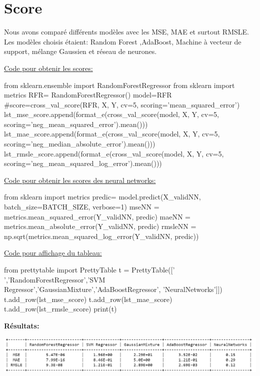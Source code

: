 \documentclass[a4paper,oneside,11pt]{article}
\begin{document}
\section*{Score}
%
\qquad Nous avons comparé différents modèles avec les MSE, MAE et surtout RMSLE. Les modèles choisis étaient: Random Forest ,AdaBoost, Machine à vecteur de support, mélange Gaussien et réseau de neurones.

\underline{Code pour obtenir les scores:}
\begin{code-Python}
from sklearn.ensemble import RandomForestRegressor 
from sklearn import metrics
RFR= RandomForestRegressor()
model=RFR
#score=cross_val_score(RFR, X, Y, cv=5, scoring='mean_squared_error')
lst_mse_score.append(format_e(cross_val_score(model, X, Y, cv=5, scoring='neg_mean_squared_error').mean()))
lst_mae_score.append(format_e(cross_val_score(model, X, Y, cv=5, scoring='neg_median_absolute_error').mean()))
lst_rmsle_score.append(format_e(cross_val_score(model, X, Y, cv=5, scoring='neg_mean_squared_log_error').mean()))
\end{code-Python}

\underline{Code pour obtenir les scores des neural networks:}
\begin{code-Python}
from sklearn import metrics
predic= model.predict(X_validNN, batch_size=BATCH_SIZE, verbose=1)
mseNN = metrics.mean_squared_error(Y_validNN, predic)
maeNN = metrics.mean_absolute_error(Y_validNN, predic)
rmsleNN = np.sqrt(metrics.mean_squared_log_error(Y_validNN, predic))
\end{code-Python}

\underline{Code pour affichage du tableau:}
\begin{code-Python}
from prettytable import PrettyTable
t = PrettyTable(['    ','RandomForestRegressor','SVM Regressor','GaussianMixture','AdaBoostRegressor', 'NeuralNetworks']])
t.add_row(lst_mse_score)
t.add_row(lst_mae_score)
t.add_row(lst_rmsle_score)
print(t)
\end{code-Python}


\textbf{Résultats:}

\hspace*{-0.1\textwidth}
\includegraphics[width=1.2\textwidth]{image_rapport/resultats}
\end{document}
